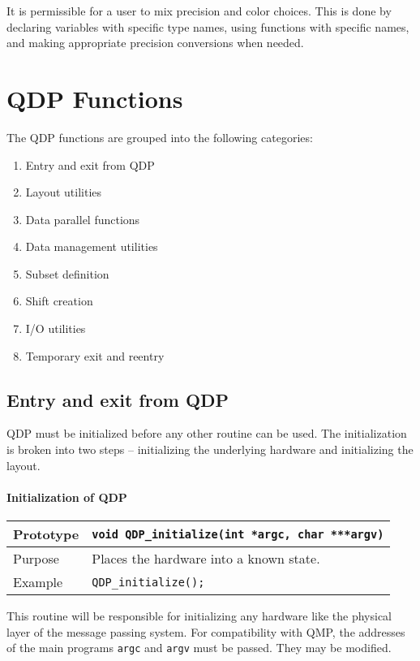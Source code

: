 \documentclass[12pt,letterpaper]{article}
\begin{document}
It is permissible for a user to mix precision and color choices.  This
is done by declaring variables with specific type names, using
functions with specific names, and making appropriate precision
conversions when needed. 

\newpage 
\section{QDP Functions}

The QDP functions are grouped into the following categories:
\begin{enumerate}
\item Entry and exit from QDP
\item Layout utilities
\item Data parallel functions
\item Data management utilities
\item Subset definition
\item Shift creation
\item I/O utilities
\item Temporary exit and reentry
\end{enumerate}

\subsection{Entry and exit from QDP}
\label{sec:init_qdp}

QDP must be initialized before any other routine can be used.
The initialization is broken into two steps -- initializing
the underlying hardware and initializing the layout.
%
\paragraph{Initialization of QDP}

\begin{flushleft}
  \begin{tabular}{|l|l|}
  \hline
  Prototype      & \verb|void QDP_initialize(int *argc, char ***argv)|\\
    \hline
  Purpose        & Places the hardware into a known state. \\
\hline
  Example  & \verb|QDP_initialize();| \\
   \hline
 \end{tabular}
\end{flushleft}
%
This routine will be responsible for initializing any hardware
like the physical layer of the message passing system. 
For compatibility with QMP, the addresses of the main programs \verb|argc|
and \verb|argv| must be passed. They may be modified.
\end{document}
